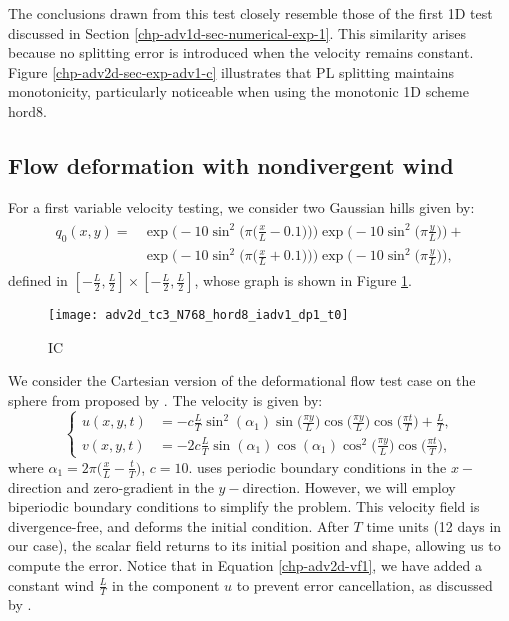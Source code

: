 The conclusions drawn from this test closely resemble those of the first 1D test discussed in Section \ref{chp-adv1d-sec-numerical-exp-1}.
This similarity arises because no splitting error is introduced when the velocity remains constant.
Figure \ref{chp-adv2d-sec-exp-adv1-c} illustrates that PL splitting maintains monotonicity, particularly noticeable when using the monotonic 1D scheme hord8.

\subsection{Flow deformation with nondivergent wind}
For a first variable velocity testing, we consider two Gaussian hills given by:
\begin{align}
	\begin{split}
	\label{chp-adv2d-ic2}
	q_0(x,y) = &\exp\bigg(-10\sin^2 \bigg(\pi \bigg(\frac{x}{L}-0.1\bigg)\bigg)\bigg) \exp\bigg(-10\sin^2 \bigg(\pi \frac{y}{L}\bigg) \bigg)+ \\
	           &\exp\bigg(-10\sin^2 \bigg(\pi \bigg(\frac{x}{L}+0.1\bigg)\bigg)\bigg) \exp\bigg(-10\sin^2 \bigg(\pi \frac{y}{L}\bigg) \bigg),
	\end{split}
\end{align}
defined in $[-\frac{L}{2},\frac{L}{2}] \times [-\frac{L}{2},\frac{L}{2}]$, whose graph is shown in Figure \ref{chp-adv2d-sec-exp-adv2-ic}.
\begin{figure}[!htb]
	\centering
	\texttt{[image: adv2d\_tc3\_N768\_hord8\_iadv1\_dp1\_t0]}
	\caption{IC\label{chp-adv2d-sec-exp-adv2-ic}}
\end{figure}

We consider the Cartesian version of the deformational flow test case on the sphere from \citet{nair:2010}
proposed by \citet{chen:2017}. The velocity is given by:
\begin{equation}
	\label{chp-adv2d-vf1}
	\begin{cases}
		u(x,y,t) &= -c\frac{L}{T} \sin^2(\alpha_1)\sin\big(\frac{\pi y}{L}\big)\cos\big(\frac{\pi y}{L}\big)  \cos\big(\frac{\pi t}{T}\big) + \frac{L}{T},\\
		v(x,y,t) &= -2c\frac{L}{T}\sin(\alpha_1)  \cos(\alpha_1)\cos^2\big(\frac{\pi y}{L}\big)\cos\big(\frac{\pi t}{T}\big),
	\end{cases}
\end{equation}
where $\alpha_1 = 2\pi\big(\frac{x}{L}-\frac{t}{T}\big)$, $c = 10$.
\citet{chen:2017} uses periodic boundary conditions in the $x-$direction and zero-gradient in the $y-$direction.
However, we will employ biperiodic boundary conditions to simplify the problem.
This velocity field is divergence-free, and deforms the initial condition.
After $T$ time units (12 days in our case), the scalar field returns to its initial position and shape, allowing us to compute the error.
Notice that in Equation \eqref{chp-adv2d-vf1}, we have added a constant wind $\frac{L}{T}$ in the component
$u$ to prevent error cancellation, as discussed by \citet{nair:2010}.

